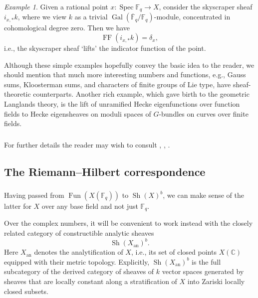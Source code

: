 \documentclass[10pt]{amsart}
\newcommand{\on}{\operatorname}
\newcommand{\Fq}{\mathbb{F}_q}
\newcommand{\Fun}{\on{Fun}}
\theoremstyle{remark}
\newtheorem{ex}[subsubsection]{Example}
\newcommand{\Sp}{\on{Spec }}
\newcommand{\C}{\ensuremath{\mathbb{C}}}
\numberwithin{equation}{section}
\begin{document}
	
	
	\begin{ex} Given a rational point $x: \Sp \Fq \rightarrow X$, consider the 
	skyscraper sheaf $i_{x, *} k$, where we view $k$ as a trivial 
	$\on{Gal}(\overline{\mathbb{F}}_q / \Fq)$-module, concentrated in 
	cohomological degree zero. Then we have 
		\[
		\on{FF}( i_{x, *} k) = \delta_x,
		\]
		i.e., the skyscraper sheaf `lifts' the indicator function of the point. 
	\end{ex}
	
	Although these simple examples hopefully  convey the basic idea 
	to the reader, we should mention that much more interesting numbers and 
	functions, e.g., Gauss sums, Kloosterman sums, and characters of finite groups 
	of Lie type, have sheaf-theoretic counterparts. Another rich 	example, which gave birth to the geometric Langlands theory, is the lift of 
	unramified Hecke eigenfunctions over function fields to Hecke eigensheaves on 
	moduli spaces of $G$-bundles on curves over finite fields. 
	
	\subsubsection{} For further details the reader may wish to consult \cite{milnenotes}, \cite{milneetalebook}, \cite{freitagbook}. 
	
	
	\subsection{The Riemann--Hilbert correspondence}
	
	\subsubsection{}  Having passed from $\Fun(X(\Fq))$ to $\on{Sh}(X)^b$, we 
	can make sense of the latter for $X$ over any base field and not just 
	$\Fq$. 
	
	Over the complex numbers, it will be convenient to work instead with the 
	closely related category of constructible analytic sheaves 
	\[
	\on{Sh}(X_{\on{an}})^b.
	\]
	Here $X_{\on{an}}$ denotes the analytification of $X$, i.e., its set of closed points $X(\C)$ equipped with their metric topology. Explicitly, $\on{Sh}(X_{\on{an}})^b$ is the full subcategory of the derived category of sheaves 
	of $k$ vector spaces generated by sheaves that are locally constant along 
	a stratification of $X$ into Zariski locally closed subsets. 
	
\end{document}
